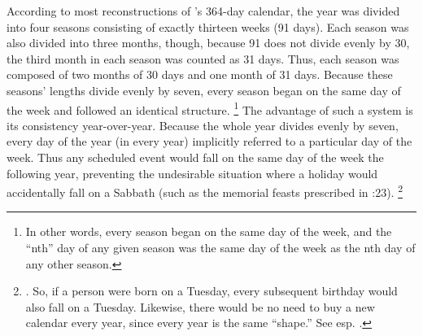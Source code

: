 According to most reconstructions of \jub's 364-day calendar, the year was divided into four seasons consisting of exactly thirteen weeks (91 days). Each season was also divided into three months, though, because 91 does not divide evenly by 30, the third month in each season was counted as 31 days. Thus, each season was composed of two months of 30 days and one month of 31 days. Because these seasons' lengths divide evenly by seven, every season began on the same day of the week and followed an identical structure.%
    \footnote{In other words, every season began on the same day of the week, and the ``nth'' day of any given season was the same day of the week as the nth day of any other season.}
The advantage of such a system is its consistency year-over-year. Because the whole year divides evenly by seven, every day of the year (in every year) implicitly referred to a particular day of the week. Thus any scheduled event would fall on the same day of the week the following year, preventing the undesirable situation where a holiday would accidentally fall on a Sabbath (such as the memorial feasts prescribed in :23).%
    \footnote{\cite[233]{bergsma2007}. So, if a person were born on a Tuesday, every subsequent birthday would also fall on a Tuesday. Likewise, there would be no need to buy a new calendar every year, since every year is the same ``shape.'' See esp. \cite[253]{jaubert_vt1953}.}

